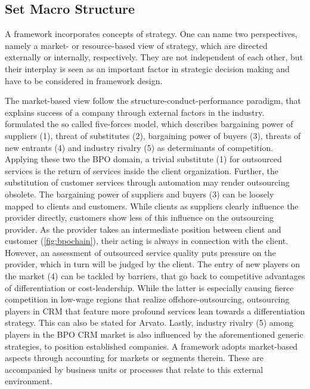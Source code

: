 	
	
	\subsection{Set Macro Structure}
	
	A framework incorporates concepts of strategy. One can name two perspectives, namely a market- or resource-based view of strategy, which are directed externally or internally, respectively. They are not independent of each other, but their interplay is seen as an important factor in strategic decision making and have to be considered in framework design. %
	
	The market-based view follow the structure-conduct-performance paradigm, that explains success of a company through external factors in the industry. \cite{porter1980} formulated the so called five-forces model, which describes bargaining power of suppliers (1), threat of substitutes (2), bargaining power of buyers (3), threats of new entrants (4) and industry rivalry (5) as determinants of competition. Applying these two the BPO domain, a trivial substitute (1) for outsourced services is the return of services inside the client organization. Further, the substitution of customer services through automation may render outsourcing obsolete. The bargaining power of suppliers and buyers (3) can be loosely mapped to clients and customers. While clients as suppliers clearly influence the provider directly, customers show less of this influence on the outsourcing provider. As the provider takes an intermediate position between client and customer (\cf \Fig \ref{fig:bpochain}), their acting is always in connection with the client. However, an assessment of outsourced service quality puts pressure on the provider, which in turn will be judged by the client. The entry of new players on the market (4) can be tackled by barriers, that go back to competitive advantages of differentiation or cost-leadership. While the latter is especially causing fierce competition in low-wage regions that realize offshore-outsourcing, outsourcing players in CRM that feature more profound services lean towards a differentiation strategy. This can also be stated for Arvato. Lastly, industry rivalry (5) among players in the BPO CRM market is also influenced by the aforementioned generic strategies, to position established companies. A framework adopts market-based aspects through accounting for markets or segments therein. These are accompanied by business units or processes that relate to this external environment. 
	
